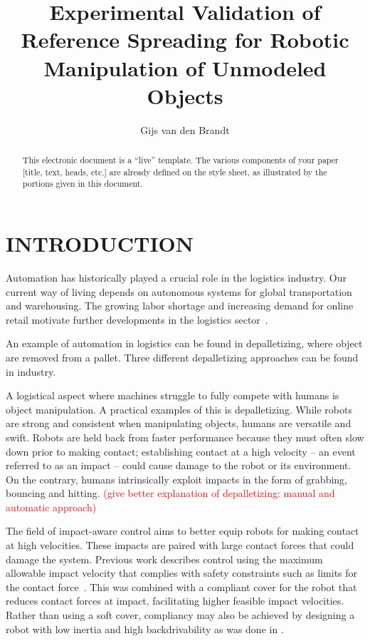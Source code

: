 \documentclass[a4paper, 10pt, conference]{ieeeconf}
\title{\LARGE \bf
    Experimental Validation of Reference Spreading for Robotic Manipulation of Unmodeled Objects
    }
\author{Gijs van den Brandt%
    }
\begin{document}
  
    \maketitle
    \thispagestyle{empty}
    \pagestyle{empty}

    \begin{abstract}

    This electronic document is a ``live'' template. The various components of your paper [title, text, heads, etc.] are already defined on the style sheet, as illustrated by the portions given in this document.

    \end{abstract}

    \section{INTRODUCTION}

    Automation has historically played a crucial role in the logistics industry. Our current way of living depends on autonomous systems for global transportation and warehousing. The growing labor shortage and increasing demand for online retail motivate further developments in the logistics sector~\cite{dekhneAutomationLogisticsBig2019}.

    An example of automation in logistics can be found in depalletizing, where object are removed from a pallet. Three different depalletizing approaches can be found in industry. 

    A logistical aspect where machines struggle to fully compete with humans is object manipulation. A practical examples of this is depalletizing. While robots are strong and consistent when manipulating objects, humans are versatile and swift. Robots are held back from faster performance because they must often slow down prior to making contact; establishing contact at a high velocity -- an event referred to as an impact -- could cause damage to the robot or its environment. On the contrary, humans intrinsically exploit impacts in the form of grabbing, bouncing and hitting. \textcolor{red}{(give better explanation of depalletizing: manual and automatic approach)}

    The field of impact-aware control aims to better equip robots for making contact at high velocities. These impacts are paired with large contact forces that could damage the system. Previous work describes control using the maximum allowable impact velocity that complies with safety constraints such as limits for the contact force~\cite{dehioRobotSafeImpactsSoft2021, dehioDualArmBoxGrabbing2022}. This was combined with a compliant cover for the robot that reduces contact forces at impact, facilitating higher feasible impact velocities. Rather than using a soft cover, compliancy may also be achieved by designing a robot with low inertia and high backdrivability as was done in \cite{songDevelopmentLowInertiaHighStiffness2018}.
\end{document}
